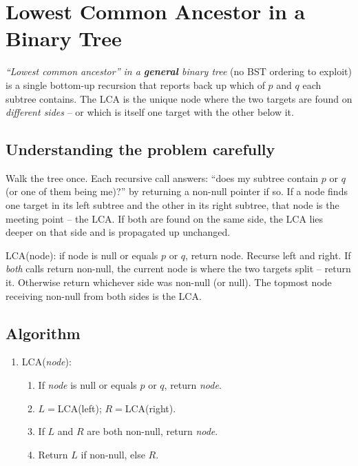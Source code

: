 \section{Lowest Common Ancestor in a Binary Tree}
\label{sec:trees-lca}


\begin{patternbox}
\emph{``Lowest common ancestor'' in a \textbf{general} binary tree} (no BST
ordering to exploit) is a single bottom-up recursion that reports back up
which of $p$ and $q$ each subtree contains. The LCA is the unique node
where the two targets are found on \emph{different sides} -- or which is
itself one target with the other below it.
\end{patternbox}

\subsection*{Understanding the problem carefully}

Walk the tree once. Each recursive call answers: ``does my subtree contain
$p$ or $q$ (or one of them being me)?'' by returning a non-null pointer if
so. If a node finds one target in its left subtree and the other in its
right subtree, that node is the meeting point -- the LCA. If both are found
on the same side, the LCA lies deeper on that side and is propagated up
unchanged.

\begin{ideabox}
\textsc{LCA}(node): if node is null or equals $p$ or $q$, return node.
Recurse left and right. If \emph{both} calls return non-null, the current
node is where the two targets split -- return it. Otherwise return whichever
side was non-null (or null). The topmost node receiving non-null from both
sides is the LCA.
\end{ideabox}

\subsection*{Algorithm}

\begin{enumerate}
  \item \textsc{LCA}(\textit{node}):
  \begin{enumerate}
    \item If \textit{node} is null or equals $p$ or $q$, return
          \textit{node}.
    \item $L=$\textsc{LCA}(left); $R=$\textsc{LCA}(right).
    \item If $L$ and $R$ are both non-null, return \textit{node}.
    \item Return $L$ if non-null, else $R$.
  \end{enumerate}
\end{enumerate}

